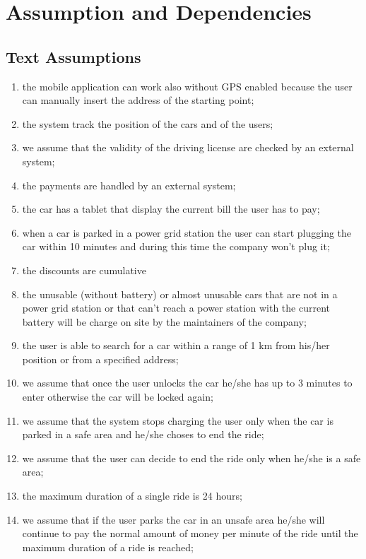 \section{Assumption and Dependencies}

\subsection{Text Assumptions}
\begin{enumerate}
	\item the mobile application can work also without GPS enabled because the user can manually insert the address of the starting point;
	\item the system track the position of the cars and of the users;
	\item we assume that the validity of the driving license are checked by an external system;
	\item the payments are handled by an external system;
	\item the car has a tablet that display the current bill the user has to pay;
	\item when a car is parked in a power grid station the user can start plugging the car within 10 minutes and during this time the company won't plug it;
	\item the discounts are cumulative
	\item the unusable (without battery) or almost unusable cars that are not in a power grid station or that can't reach a power station with the current battery will be charge on site by the maintainers of the company;
	\item the user is able to search for a car within a range of 1 km from his/her position or from a specified address;
	\item we assume that once the user unlocks the car he/she has up to 3 minutes to enter otherwise the car will be locked again;
	\item we assume that the system stops charging the user only when the car is parked in a safe area and he/she choses to end the ride;
	\item we assume that the user can decide to end the ride only when he/she is a safe area;
	\item the maximum duration of a single ride is 24 hours;
	\item we assume that if the user parks the car in an unsafe area he/she will continue to pay the normal amount of money per minute of the ride until the maximum duration of a ride is reached;

\end{enumerate}

